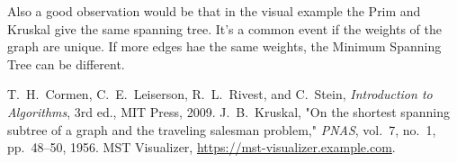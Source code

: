 \documentclass[12pt]{article}
\begin{document}
Also a good observation would be that in the visual example the Prim and Kruskal give the same spanning tree.
It's a common event if the weights of the graph are unique. If more edges hae the same weights, the Minimum 
Spanning Tree can be different.

\clearpage
\begin{thebibliography}{9}
   T.~H.~Cormen, C.~E.~Leiserson, R.~L.~Rivest, and C.~Stein, \emph{Introduction to Algorithms}, 3rd ed., MIT Press, 2009.
   J.~B.~Kruskal, "On the shortest spanning subtree of a graph and the traveling salesman problem," \emph{PNAS}, vol.~7, no.~1, pp.~48--50, 1956.
   MST Visualizer, \url{https://mst-visualizer.example.com}.
\end{thebibliography}
\end{document}
